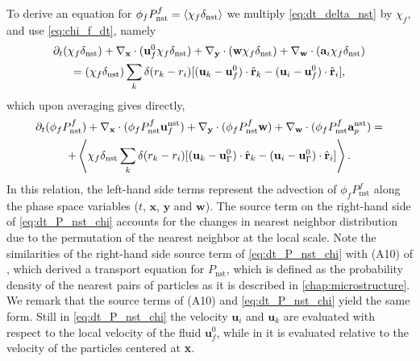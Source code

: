 To derive an equation for $\phi_f P_\text{nst}^f = \left<\chi_f \delta_\text{nst}\right>$ we multiply \ref{eq:dt_delta_nst} by $\chi_f$, and use \ref{eq:chi_f_dt}, namely
\begin{multline}
    \pddt (\chi_f\delta_\text{nst})
    +  \pddx \cdot (\textbf{u}_f^0 \chi_f\delta_\text{nst})
    +  \pddy \cdot (\textbf{w}    \chi_f\delta_\text{nst})
    +  \pddw \cdot   (\textbf{a}_i  \chi_f\delta_\text{nst})\\
    = 
    (\chi_f\delta_\text{nst})
    \sum_k 
    \delta(r_k - r_i)
    [(\textbf{u}_k - \textbf{u}_f^0) \cdot \hat{\textbf{r}}_k - (\textbf{u}_i  - \textbf{u}_f^0)\cdot \hat{\textbf{r}}_i],
    \label{eq:dt_delta_nst_chi}
\end{multline}
which upon averaging gives directly,
\begin{multline}
    \pddt (\phi_fP_\text{nst}^f)
    + 
    \pddx \cdot (
        \phi_f 
        P_\text{nst}^f
        \textbf{u}_f^\text{nst}
    )
    + \pddy \cdot (
        \phi_f
        P_\text{nst}^f
        \textbf{w} 
    )
    +
    \pddw \cdot (  
        \phi_f 
        P_\text{nst}^f
        \textbf{a}_p^\text{nst} 
    )
    = \\
    + \avg{
     \chi_f \delta_\text{nst}
    \sum_k 
    \delta(r_k - r_i)
    [(\textbf{u}_k - \textbf{u}_\Gamma^0) \cdot \hat{\textbf{r}}_k - (\textbf{u}_i- \textbf{u}_\Gamma^0)  \cdot \hat{\textbf{r}}_i]}.
    \label{eq:dt_P_nst_chi}
\end{multline}
In this relation, the left-hand side terms represent the advection of $\phi_f P_\text{nst}^f$ along the phase space variables ($t$, $\textbf{x}$, $\textbf{y}$ and $\textbf{w}$).
The source term on the right-hand side of \ref{eq:dt_P_nst_chi} accounts for the changes in nearest neighbor distribution due to the permutation of the nearest neighbor at the local scale. 
Note the similarities of the right-hand side source term of \ref{eq:dt_P_nst_chi} with (A10) of \citet{zhang2023evolution}, which derived a transport equation for $P_\text{nst}$, which is defined as the probability density of the nearest pairs of particles as it is described in \ref{chap:microstructure}. 
We remark that the source terms of (A10) \citet{zhang2023evolution} and \ref{eq:dt_P_nst_chi} yield the same form.
Still in \ref{eq:dt_P_nst_chi} the velocity $\textbf{u}_i$ and $\textbf{u}_k$ are evaluated with respect to the local velocity of the fluid $\textbf{u}_f^0$, while in \citet{zhang2023evolution} it is evaluated relative to the velocity of the particles centered at \textbf{x}. 


